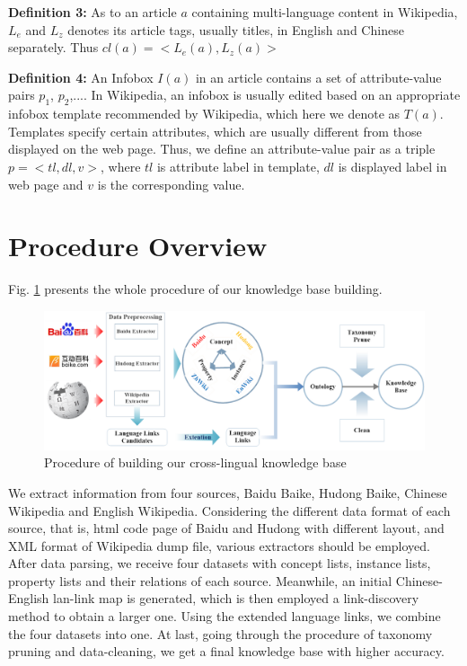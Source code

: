 \documentclass[runningheads,a4paper]{llncs}
\begin{document}
\textbf{Definition 3:} As to an article $a$ containing multi-language content in Wikipedia, $L_{e}$ and $L_{z}$ denotes its article tags, usually titles, in English and Chinese separately. Thus $cl(a) = <L_{e}(a), L_{z}(a)>$

\textbf{Definition 4:} An Infobox $I(a)$ in an article contains a set of attribute-value pairs {$p_{1}$, $p_{2}$,...}. In Wikipedia, an infobox is usually edited based on an appropriate infobox template recommended by Wikipedia, which here we denote as $T(a)$. Templates specify certain attributes, which are usually different from those displayed on the web page. Thus, we define an attribute-value pair as a triple $p=<tl,dl,v>$, where $tl$ is attribute label in template, $dl$ is displayed label in web page and $v$ is the corresponding value.

\section{Procedure Overview}
Fig. \ref{fig:procedure} presents the whole procedure of our knowledge base building.
\begin{figure}[ht]
    \centerline{\includegraphics[width=1\columnwidth]{fig/procedure}}
    \label{fig:procedure}
    \caption{Procedure of building our cross-lingual knowledge base}
\end{figure}%
We extract information from four sources, Baidu Baike, Hudong Baike, Chinese Wikipedia and English Wikipedia. Considering the different data format of each source, that is, html code page of Baidu and Hudong with different layout, and XML format of Wikipedia dump file, various extractors should be employed. After data parsing, we receive four datasets with concept lists, instance lists, property lists and their relations of each source. Meanwhile, an initial Chinese-English lan-link map is generated, which is then employed a link-discovery method to obtain a larger one. Using the extended language links, we combine the four datasets into one. At last, going through the procedure of taxonomy pruning and data-cleaning, we get a final knowledge base with higher accuracy.
\end{document}
